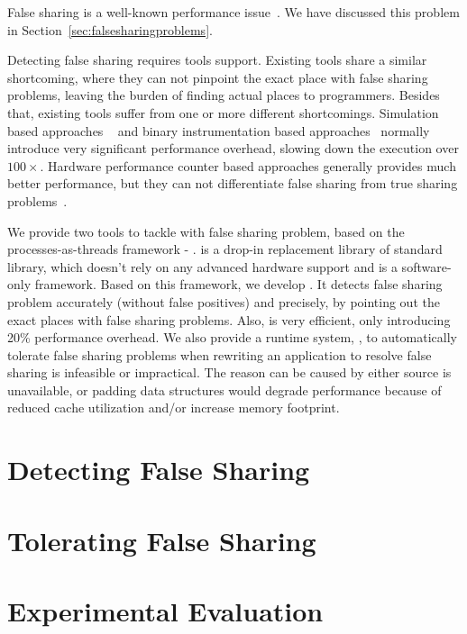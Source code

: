 \label{chapter:sherifftools}

False sharing is a well-known performance issue~\cite{falseshare:Analysis, falseshare:effect}. We have discussed this problem in Section~\ref{sec:falsesharingproblems}. 

Detecting false sharing requires tools support. Existing tools share a similar shortcoming, where they can not pinpoint the exact place with false sharing problems, leaving the burden of finding actual places to programmers. Besides that, existing tools suffer from one or more different shortcomings.  Simulation based approaches ~\cite{falseshare:simulator} and binary instrumentation based approaches~\cite{falseshare:binaryinstrumentation1, falseshare:binaryinstrumentation2} normally introduce very significant performance overhead, slowing down the execution over $100\times$. Hardware performance counter based approaches generally provides much better performance, but they can not differentiate false sharing from true sharing problems~\cite{detect:ptu, detect:intel}.

We provide two tools to tackle with false sharing problem, based on the processes-as-threads framework - \sheriff{}. \Sheriff{} is a drop-in replacement library  of standard \pthreads{} library, which doesn't rely on any advanced hardware support and is a software-only framework. Based on this framework, we develop \SheriffDetect{}. It detects false sharing problem accurately (without false positives) and precisely, by pointing out the exact places with false sharing problems. Also, \SheriffDetect{} is very efficient, only introducing 20\% performance overhead. We also provide a runtime system, \SheriffProtect{}, to automatically tolerate false sharing problems when rewriting an application to resolve false sharing is infeasible or impractical. The reason can be caused by either source is unavailable, or padding data structures would degrade performance because of reduced cache utilization and/or increase memory footprint.


%

\section{Detecting False Sharing}


\section{Tolerating False Sharing}


\section{Experimental Evaluation}

